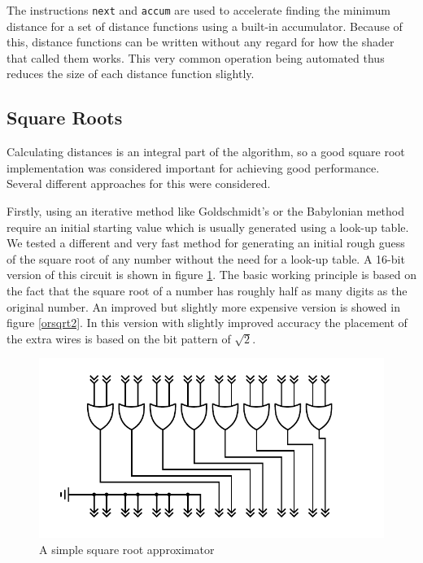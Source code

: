 			The instructions \texttt{next} and \texttt{accum} are used to accelerate
			finding the minimum distance for a set of distance functions using a
			built-in accumulator. Because of this, distance functions can be written
			without any regard for how the shader that called them works. This very
			common operation being automated thus reduces the size of each distance
			function slightly.

		\subsection{Square Roots}

			Calculating distances is an integral part of the algorithm, so a
			good square root implementation was considered important for
			achieving good performance. Several different approaches for this
			were considered.

			Firstly, using an iterative method like Goldschmidt's or the 
			Babylonian
			method require an initial starting value which is usually generated
			using a look-up table. We tested a different and very fast method for
			generating an initial rough guess of the square root of any number
			without the need for a look-up table. A 16-bit version of this circuit is
			shown in figure \ref{orsqrt}. The basic working principle is
			based on the fact that the square root of a number has roughly half as
			many digits as the original number. An improved but slightly more expensive
			version is showed in figure \ref{orsqrt2}. In this version with slightly improved
			accuracy the placement of the extra wires is based on the bit pattern of
			$\sqrt{2}$.

			\begin{figure}
				\centering
				\caption{A simple square root approximator}
				\label{orsqrt}
				\includegraphics[width=0.75\linewidth]{figure/pdf/simpleOr.pdf} 
			\end{figure}

